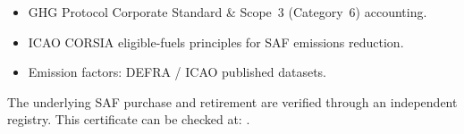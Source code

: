 \begin{itemize}\setlength\itemsep{1pt}\setlength\parskip{0pt}
  \item GHG Protocol Corporate Standard \& Scope~3 (Category~6) accounting.
  \item ICAO CORSIA eligible-fuels principles for SAF emissions reduction.
  \item Emission factors: DEFRA / ICAO published datasets.
\end{itemize}

The underlying SAF purchase and retirement are verified through an independent
registry. This certificate can be checked at: \textbf{\verifyURL}.
